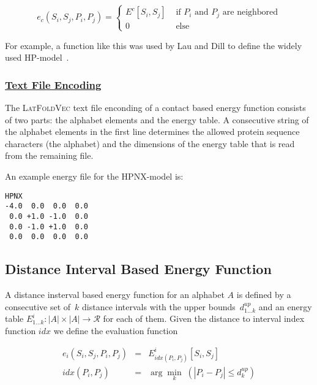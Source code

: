 \documentclass{article}
\newcommand{\latFoldVec}{\textsc{LatFoldVec}}
\newenvironment{boxit}{\begin{lrbox}{\savepar}\begin{minipage}[t]{0.8\textwidth}}
                      {\end{minipage}\end{lrbox}\fbox{\usebox{\savepar}}}
\begin{document}
\begin{equation}
	e_c(S_i, S_j, P_i, P_j) = 
	\left\{
	\begin{array}{ll}
    	E^c[S_i,S_j] & \mbox{ if $P_i$ and $P_j$ are neighbored} \\
    	0 & \mbox{ else }
    \end{array} \right.
\end{equation}

For example, a function like this was used by Lau and Dill to define the widely
used HP-model~\cite{Lau_Dill:89a}.

\subsubsection*{\underline{ Text File Encoding }}

The \latFoldVec{} text file enconding of a contact based energy function consists of
two parts: the alphabet elements and the energy table. A consecutive string of
the alphabet elements in the first line determines the allowed protein sequence
characters (the alphabet) and the dimensions of the energy table that is read
from the remaining file.

An example energy file for the HPNX-model is:

\begin{center}
\begin{boxit}
\small
\begin{verbatim}
HPNX
-4.0  0.0  0.0  0.0
 0.0 +1.0 -1.0  0.0
 0.0 -1.0 +1.0  0.0
 0.0  0.0  0.0  0.0
\end{verbatim}
\end{boxit}
\end{center}


\subsection{Distance Interval Based Energy Function}
\label{sec:energy:distance}

A distance insterval based energy function for an alphabet $A$ is defined by a
consecutive set of~$k$ distance intervals with the upper bounds~$d^{up}_{1\ldots
k}$ and an energy table $E^i_{1\ldots k} : |A|\times|A| \rightarrow \mathcal{R}$
for each of them. Given the distance to interval index function $idx$ we define
the evaluation function

\begin{eqnarray}
	e_i(S_i, S_j, P_i, P_j) & = & E^i_{idx(P_i,P_j)}[S_i,S_j] \\
	idx(P_i,P_j) & = & \arg\min_{k}\;(|P_i-P_j| \leq d^{up}_k)
\end{eqnarray}
\end{document}
